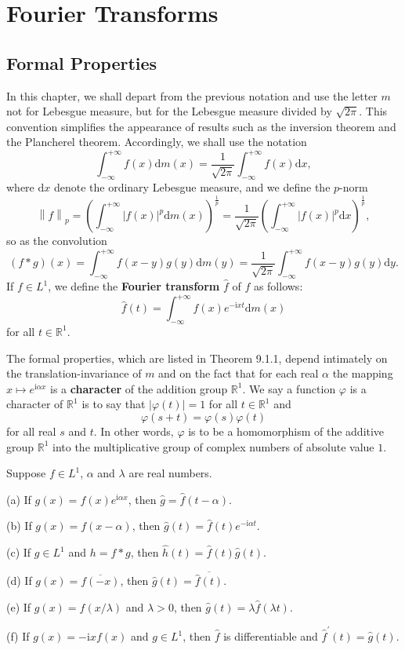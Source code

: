 \newpage
\section{Fourier Transforms}
\subsection{Formal Properties}
In this chapter, we shall depart from the previous notation and use the letter $m$ not for Lebesgue measure, but for the Lebesgue measure divided by $\sqrt{2\pi}$. This convention simplifies the appearance of results such as the inversion theorem and the Plancherel theorem. Accordingly, we shall use the notation 
$$
\int_{-\infty}^{+\infty}{f\left( x \right) \mathrm{d}m\left( x \right)}=\frac{1}{\sqrt{2\pi}}\int_{-\infty}^{+\infty}{f\left( x \right) \mathrm{d}x},
$$
where $\mathrm{d}x$ denote the ordinary Lebesgue measure, and we define the $p$-norm 
$$
\left\| f \right\| _p=\left( \int_{-\infty}^{+\infty}{\left| f\left( x \right) \right|^p\mathrm{d}m\left( x \right)} \right) ^{\frac{1}{p}}=\frac{1}{\sqrt{2\pi}}\left( \int_{-\infty}^{+\infty}{\left| f\left( x \right) \right|^p\mathrm{d}x} \right) ^{\frac{1}{p}},
$$
so as the convolution 
$$
\left( f*g \right) \left( x \right) =\int_{-\infty}^{+\infty}{f\left( x-y \right) g\left( y \right) \mathrm{d}m\left( y \right)}=\frac{1}{\sqrt{2\pi}}\int_{-\infty}^{+\infty}{f\left( x-y \right) g\left( y \right) \mathrm{d}y}.
$$
If $f\in L^1$, we define the \textbf{Fourier transform} $\widehat{f}$ of $f$ as follows: 
$$
\widehat{f}\left( t \right) =\int_{-\infty}^{+\infty}{f\left( x \right) e^{-\mathrm{i}xt}\mathrm{d}m\left( x \right)}
$$
for all $t\in\mathbb{R}^1$.\par
The formal properties, which are listed in Theorem 9.1.1, depend intimately on the translation-invariance of $m$ and on the fact that for each real $\alpha$ the mapping $x\mapsto e^{\mathrm{i}\alpha x}$ is a \textbf{character} of the addition group $\mathbb{R}^1$. We say a function $\varphi$ is a character of $\mathbb{R}^1$ is to say that $|\varphi(t)|=1$ for all $t\in\mathbb{R}^1$ and 
$$\varphi(s+t)=\varphi(s)\varphi(t)$$
for all real $s$ and $t$. In other words, $\varphi$ is to be a homomorphism of the additive group $\mathbb{R}^1$ into the multiplicative group of complex numbers of absolute value $1$.
\begin{theorem}
Suppose $f\in L^1$, $\alpha$ and $\lambda$ are real numbers.\par
(a) If $g(x)=f(x)e^{\mathrm{i}\alpha x}$, then $\widehat{g}=\widehat{f}(t-\alpha)$.\par
(b) If $g(x)=f(x-\alpha)$, then $\widehat{g}(t)=\widehat{f}(t)e^{-\mathrm{i}\alpha t}$.\par
(c) If $g\in L^1$ and $h=f*g$, then $\widehat{h}(t)=\widehat{f}(t)\widehat{g}(t)$.\par
(d) If $g(x)=\overline{f(-x)}$, then $\widehat{g}(t)=\overline{\widehat{f}(t)}$.\par
(e) If $g(x)=f(x/\lambda)$ and $\lambda>0$, then $\widehat{g}(t)=\lambda\widehat{f}(\lambda t)$.\par
(f) If $g(x)=-\mathrm{i}xf(x)$ and $g\in L^1$, then $\widehat{f}$ is differentiable and $\widehat{f}^\prime(t)=\widehat{g}(t)$.
\end{theorem}
